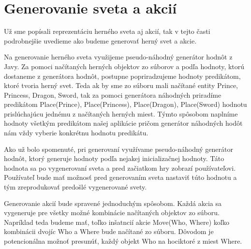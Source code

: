\section{Generovanie sveta a akcií}
Už sme popísali reprezentáciu herného sveta aj akcií, tak v tejto časti podrobnejšie uvedieme ako budeme generovať herný svet a akcie.\par
Na generovanie herného sveta využijeme pseudo-náhodný generátor hodnôt z Javy. Za pomoci načítaných herných objektov zo súborov a podľa hodnoty, ktorú dostaneme z generátora hodnôt, postupne popriradzujeme hodnoty predikátom, ktoré tvoria herný svet. Teda ak by sme zo súboru mali načítané entity Prince, Princess, Dragon, Sword, tak za pomoci generátora náhodných priradíme predikátom Place(Prince), Place(Princess), Place(Dragon), Place(Sword) hodnotu prislúchajúcu jednému z načítaných herných miest. Týmto spôsobom naplníme hodnoty všetkým predikátom našej aplikácie pričom generátor náhodných hodôt nám vždy vyberie konkrétnu hodnotu predikátu.\par
Ako už bolo spomenuté, pri generovaní využívame pseudo-náhodný generátor hodnôt, ktorý generuje hodnoty podľa nejakej inicializačnej hodnoty. Táto hodnota sa po vygenerovaní sveta a pred začiatkom hry zobrazí používateľovi. Používateľ bude mať možnosť pred generovaním sveta nastaviť túto hodnotu a tým zreprodukovať predošlé vygenerované svety.\par
Generovanie akcií bude spravené jednoduchým spôsobom. Každá akcia sa vygeneruje pre všetky možné kombinácie načítaných objektov zo súboru. Napríklad teda budeme mať, toľko inšatncií akcie Move(Who, Where) koľko kombinácii dvojíc Who a Where bude načítané zo súboru. Dôvodom je potencionálna možnoť presunúť, každý objekt Who na hociktoré z miest Where. 
